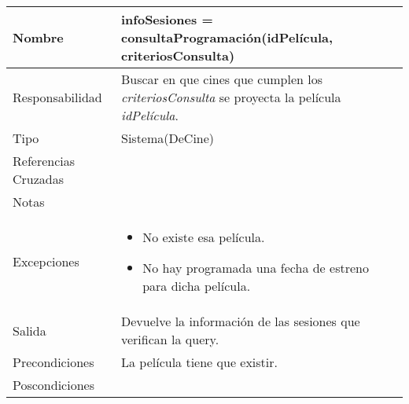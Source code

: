 \documentclass{article}
\begin{document}
\begin{table}[h]
\begin{tabular}{|l|l|l|l|l|l|}
\hline
\multicolumn{2}{|p{3cm}|}{Nombre} & \multicolumn{4}{p{10cm}|}{\textbf{infoSesiones = consultaProgramación(idPelícula, criteriosConsulta)}}\\
\hline
\multicolumn{2}{|p{3cm}|}{Responsabilidad} & \multicolumn{4}{p{10cm}|}{Buscar en que cines que cumplen los \textit{criteriosConsulta} se proyecta la película \textit{idPelícula}.} \\
\hline
\multicolumn{2}{|p{3cm}|}{Tipo} & \multicolumn{4}{p{10cm}|}{Sistema(DeCine)} \\
\hline
\multicolumn{2}{|p{3cm}|}{Referencias Cruzadas} & \multicolumn{4}{p{10cm}|}{} \\
\hline
\multicolumn{2}{|p{3cm}|}{Notas} & \multicolumn{4}{p{10cm}|}{} \\
\hline
\multicolumn{2}{|p{3cm}|}{Excepciones} & \multicolumn{4}{p{10cm}|}{\begin{itemize}
\item No existe esa película.
\item No hay programada una fecha de estreno para dicha película.
\end{itemize}} \\
\hline
\multicolumn{2}{|p{3cm}|}{Salida} & \multicolumn{4}{p{10cm}|}{Devuelve la información de las sesiones que verifican la query.} \\
\hline
\multicolumn{2}{|p{3cm}|}{Precondiciones} & \multicolumn{4}{p{10cm}|}{La película tiene que existir.} \\
\hline
\multicolumn{2}{|p{3cm}|}{Poscondiciones} & \multicolumn{4}{p{10cm}|}{} \\
\hline
\end{tabular}
\end{table}
\end{document}
